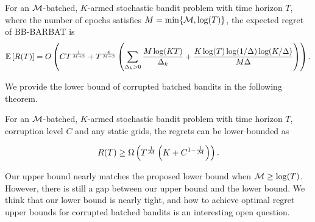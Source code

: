 \begin{theorem}
\label{the:bb-erb}
For an ${\mathcal{M}}$-batched, $K$-armed stochastic bandit problem with time horizon $T$, where the number of epochs satisfies $M = \min\{{\mathcal{M}}, \log(T)\}$, the expected regret of BB-BARBAT is
\[
    {\mathbb{E}}\left[R(T)\right] = O\left( C T^{\frac{1}{M+3}} + T^{\frac{4}{M+3}} \left( \sum_{\Delta_k > 0} \frac{M \log(KT)}{\Delta_k} + \frac{K \log(T) \log(1/\Delta) \log(K/\Delta)}{M \Delta} \right) \right).
\]
\end{theorem}
We provide the lower bound of corrupted batched bandits in the following theorem.

\begin{theorem}
\label{the:bb-lb}
    For an ${\mathcal{M}}$-batched, $K$-armed stochastic bandit problem with time horizon $T$, corruption level $C$ and any static grids, the regrets can be lower bounded as
    
    \[
    R(T) \geq \Omega\left(T^{\frac{1}{{\mathcal{M}}}}\left(K + C^{1 - \frac{1}{{\mathcal{M}}}}\right)\right).
    \]
\end{theorem}
\begin{remark}
Our upper bound nearly matches the proposed lower bound when ${\mathcal{M}}\ge \log(T)$. However, there is still a gap between our upper bound and the lower bound. We think that our lower bound is nearly tight, and how to achieve optimal regret upper bounds for corrupted batched bandits is an interesting open question. 
\end{remark}
